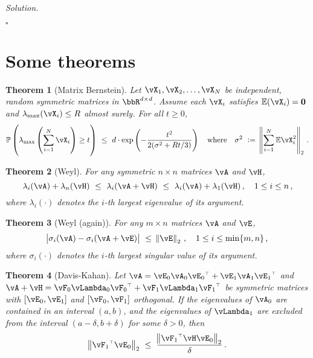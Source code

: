 \documentclass[11pt]{article}
\renewcommand\v[1]{{\ensuremath{\boldsymbol{#1}}}}
\renewcommand\t{{\ensuremath{\scriptscriptstyle{\top}}}}
\newcommand{\E}{\ensuremath{\mathbb{E}}} %
\renewcommand{\P}{\ensuremath{\mathbb{P}}} %
\newtheorem{theorem}{Theorem}
\theoremstyle{definition}
\newenvironment{solution}{\noindent\emph{Solution.}}{\hfill$\square$}
\begin{document}
\begin{solution}
\begin{enumerate}
  \end{enumerate}
\end{solution}

\newpage


\section*{Some theorems}

\begin{theorem}[Matrix Bernstein]
  \label{thm:matrix-bernstein}
  Let $\vX_1, \vX_2, \dotsc, \vX_N$ be independent, random symmetric matrices
  in $\bbR^{d \times d}$.
  Assume each $\vX_i$ satisfies $\E(\vX_i) = \v0$ and $\lambda_{\max}(\vX_i)
  \leq R$ almost surely.
  For all $t \geq 0$,
  \begin{equation*}
    \P\del{ \lambda_{\max}\del{\sum_{i=1}^N \vX_i} \geq t }
    \ \leq \ d \cdot \exp\del{ -\frac{t^2}{2(\sigma^2+Rt/3)} }
    \quad
    \text{where}
    \quad
    \sigma^2 \ := \ \norm{\sum_{i=1}^N \E\vX_i^2}_2
    \,.
  \end{equation*}
\end{theorem}

\begin{theorem}[Weyl]
  \label{thm:weyl}
  For any symmetric $n \times n$ matrices $\vA$ and $\vH$,
  \[
    \lambda_i(\vA) + \lambda_n(\vH)
    \ \leq \ \lambda_i(\vA + \vH) \ \leq \
    \lambda_i(\vA) + \lambda_1(\vH)
    \,,
    \quad 1 \leq i \leq n
    \,,
  \]
  where $\lambda_i(\cdot)$ denotes the $i$-th largest eigenvalue of its
  argument.
\end{theorem}

\begin{theorem}[Weyl (again)]
  \label{thm:weyl2}
  For any $m \times n$ matrices $\vA$ and $\vE$,
  \[
    \abs{\sigma_i(\vA) - \sigma_i(\vA+\vE)}
    \ \leq \
    \norm{\vE}_2
    \,,
    \quad 1 \leq i \leq \min\{m,n\}
    \,,
  \]
  where $\sigma_i(\cdot)$ denotes the $i$-th largest singular value of its
  argument.
\end{theorem}

\begin{theorem}[Davis-Kahan]
  \label{thm:davis-kahan}
  Let $\vA = \vE_0 \vA_0 {\vE_0}^\t + \vE_1 \vA_1 {\vE_1}^\t$ and $\vA+\vH =
  \vF_0 \vLambda_0 {\vF_0}^\t + \vF_1 \vLambda_1 {\vF_1}^\t$ be symmetric
  matrices with $[\vE_0, \vE_1]$ and $[\vF_0, \vF_1]$ orthogonal.
  If the eigenvalues of $\vA_0$ are contained in an interval $(a,b)$, and the
  eigenvalues of $\vLambda_1$ are excluded from the interval
  $(a-\delta,b+\delta)$ for some $\delta > 0$, then
  \[
    \norm{{\vF_1}^\t \vE_0}_2
    \ \leq \
    \frac{\norm{{\vF_1}^\t\vH\vE_0}_2}{\delta}
    \,.
  \]
\end{theorem}
\end{document}
